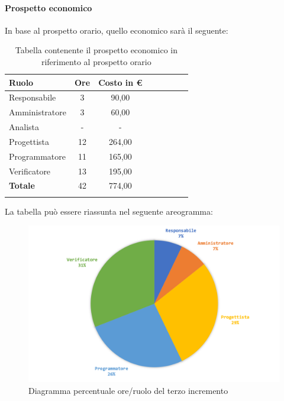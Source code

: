			\paragraph{Prospetto economico}
			In base al prospetto orario, quello economico sarà il seguente: 
			
			\begin{longtable}{|l|c|c|c|c|c|c|c|}
				\hline
				\rowcolor{lighter-grayer}
				\textbf{Ruolo} & \textbf{Ore} & \textbf{Costo in € } \\
				\hline
				\endfirsthead
				
				\hline
				Responsabile 	    & 3 & 90,00\\
				\hline 
				\hline
				Amministratore	   & 3 & 60,00\\
				\hline
				\hline
				Analista 				& - & -\\
				\hline
				\hline
				Progettista 		   & 12 & 264,00\\
				\hline
				\hline
				Programmatore 	  & 11 & 165,00\\
				\hline
				\hline
				Verificatore 		   & 13 & 195,00\\
				\hline
				\textbf{Totale} 	 & 42 & 774,00\\
				\hline
				\caption{Tabella contenente il prospetto economico in riferimento al prospetto orario}
			\end{longtable}
			\pagebreak
			
			La tabella può essere riassunta nel seguente areogramma:
			\begin{figure}[H]
				\centering
				\includegraphics[width=0.8\linewidth]{./images/preventivo/incremento3-2.png}
				\caption{Diagramma percentuale ore/ruolo del terzo incremento}
				\label{fig:diagramma costi ruolo incremento III}
			\end{figure}
			
